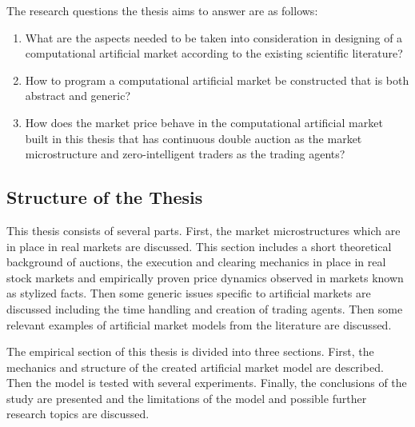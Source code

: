The research questions the thesis aims to answer are as follows:
\begin{enumerate}
    \item What are the aspects needed to be taken into consideration in designing of a computational 
          artificial market according to the existing scientific literature?
	\item How to program a computational artificial market be constructed that is both abstract and generic?
    \item How does the market price behave in the computational artificial market built in this thesis that has continuous
          double auction as the market microstructure and zero-intelligent traders as the 
          trading agents?
\end{enumerate}


\subsection{Structure of the Thesis}
This thesis consists of several parts. First, the market microstructures which are in place in real 
markets are discussed. This section includes a short theoretical background of auctions, the execution and clearing mechanics in place in real
stock markets and empirically proven price dynamics observed in markets known as stylized
facts. Then some generic issues specific to artificial markets are discussed including the time handling and creation
of trading agents. Then some relevant examples of artificial market models from the literature are discussed. 

The empirical section of this thesis is divided into three sections. First, the mechanics and
structure of the created artificial market model are described. Then the model is tested
with several experiments. Finally, the conclusions of the study are presented and the limitations of the model and
possible further research topics are discussed.